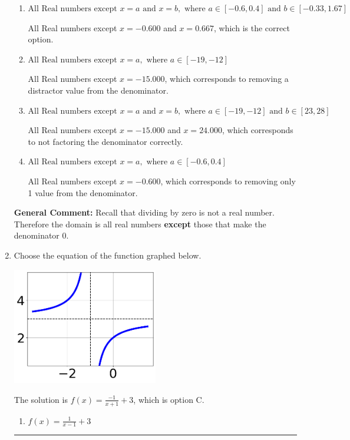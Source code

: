 \documentclass{extbook}[14pt]
\newcommand{\litem}[1]{\item #1

\rule{\textwidth}{0.4pt}}
\begin{document}
\begin{enumerate}
{\begin{enumerate}[label=\Alph*.]
This corresponds to thinking the denominator has complex roots or that rational functions have a domain of all Real numbers.
\item \( \text{All Real numbers except } x = a \text{ and } x = b, \text{ where } a \in [-0.6, 0.4] \text{ and } b \in [-0.33, 1.67] \)

All Real numbers except $x = -0.600$ and $x = 0.667$, which is the correct option.
\item \( \text{All Real numbers except } x = a, \text{ where } a \in [-19, -12] \)

All Real numbers except $x = -15.000$, which corresponds to removing a distractor value from the denominator.
\item \( \text{All Real numbers except } x = a \text{ and } x = b, \text{ where } a \in [-19, -12] \text{ and } b \in [23, 28] \)

All Real numbers except $x = -15.000$ and $x = 24.000$, which corresponds to not factoring the denominator correctly.
\item \( \text{All Real numbers except } x = a, \text{ where } a \in [-0.6, 0.4] \)

All Real numbers except $x = -0.600$, which corresponds to removing only 1 value from the denominator.
\end{enumerate}

\textbf{General Comment:} Recall that dividing by zero is not a real number. Therefore the domain is all real numbers \textbf{except} those that make the denominator 0.
}
\litem{
Choose the equation of the function graphed below.

\begin{center}
    \includegraphics[width=0.5\textwidth]{../Figures/rationalGraphToEquationC.png}
\end{center}


The solution is \( f(x) = \frac{-1}{x + 1} + 3 \), which is option C.\begin{enumerate}[label=\Alph*.]
\item \( f(x) = \frac{1}{x - 1} + 3 \)


\end{enumerate}}
\end{enumerate}
\end{document}

